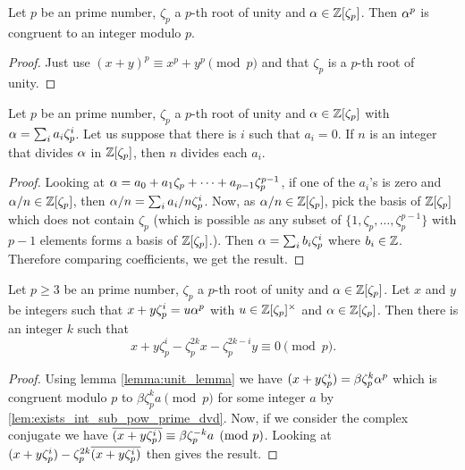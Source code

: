 \begin{lemma}\label{lem:exists_int_sub_pow_prime_dvd}
  \leanok
	Let $p$ be an prime number, $\zeta_p$ a $p$-th root of unity and $\alpha \in \mathbb{Z}[\zeta_p]$. Then $\alpha^p$ is congruent to an integer modulo $p$.
\end{lemma}
\begin{proof}
		\leanok
	  Just use $(x+y)^p \equiv x^p + y^p \pmod p$ and that $\zeta_p$ is a $p$-th root of unity.
\end{proof}

\begin{lemma}\label{lem:dvd_coeff_cycl_integer}
  \leanok
	Let $p$ be an prime number, $\zeta_p$ a $p$-th root of unity and $ \alpha \in \mathbb{Z}[\zeta_p]$ with $\alpha=\sum_i a_i \zeta_p^i$. Let us suppose that there is $i$ such that $a_i = 0$. If $n$ is an integer that divides $\alpha$ in $\mathbb{Z}[\zeta_p]$, then $n$ divides each $a_i$.
\end{lemma}
\begin{proof}
	\leanok
	 Looking at $\alpha=a_0+a_1\zeta_p+\cdots+a_{p-1}\zeta_p^{p-1}$, if one of the $a_i$'s is zero and $\alpha/n \in \mathbb{Z}[\zeta_p]$, then $\alpha/n=\sum_i a_i/n \zeta_p^i$. Now, as $\alpha/n \in \mathbb{Z}[\zeta_p]$, pick the basis of $\mathbb{Z}[\zeta_p]$ which does not contain $\zeta_p$ (which is possible as any subset of $\{1,\zeta_p,\dots,\zeta_p^{p-1}\}$ with $p-1$ elements forms a basis of $\mathbb{Z}[\zeta_p]$.). Then $\alpha=\sum_i b_i \zeta_p^i$ where $b_i \in \mathbb{Z}$. Therefore comparing coefficients, we get the result.
\end{proof}

\begin{lemma}\label{lem:exists_int_sum_eq_zero}
	\leanok
	Let $p \geq 3$ be an prime number, $\zeta_p$ a $p$-th root of unity and $ \alpha \in \mathbb{Z}[\zeta_p]$. Let $x$ and $y$ be integers such that $x+y\zeta_p^i=u \alpha^p$ with $u \in \mathbb{Z}[\zeta_p]^\times$ and $\alpha \in \mathbb{Z}[\zeta_p]$. Then there is an integer $k$ such that \[x+y\zeta_p^i-\zeta_p^{2k}x-\zeta_p^{2k-i}y \equiv 0 \pmod p.\]
\end{lemma}
\begin{proof}
 \leanok
 Using lemma \ref{lemma:unit_lemma} we have $(x+y\zeta_p^i) =\beta \zeta_p^k \alpha^p$ which is congruent modulo $p$ to $\beta \zeta_p^k a \pmod p$ for some integer $a$ by \ref{lem:exists_int_sub_pow_prime_dvd}. Now, if we consider the complex conjugate we have $\overline{(x+y\zeta_p^i)  }\equiv \beta \zeta_p^{-k}a \pmod p$. Looking at $(x+y\zeta_p^i)-\zeta_p^{2k}\overline{(x+y\zeta_p^i)  }$ then gives the result.
\end{proof}

